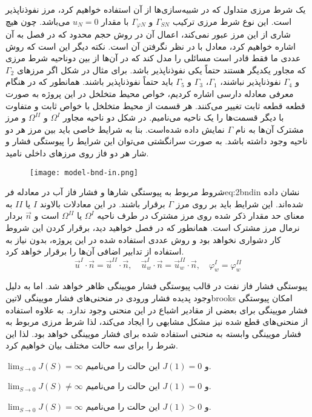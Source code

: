 یک شرط مرزی متداول که در شبیه‌سازی‌ها از آن استفاده خواهیم کرد، مرز نفوذناپذیر است. این نوع شرط مرزی ترکیب $\Gamma_{SN}$ و $\Gamma_{\varphi N}$ با مقدار $u_N = 0$ می‌باشد. چون هیچ شاری از این مرز عبور نمی‌کند، اعمال آن در روش حجم محدود که در فصل  به آن اشاره خواهیم کرد، معادل با در نظر نگرفتن آن است. نکته دیگر این است که روش عددی ما فقط قادر است مسائلی را مدل کند که در آن‌ها از بین دوناحیه شرط مرزی که مجاور یکدیگر هستند حتماً یکی نفوذناپذیر باشد. برای مثال در شکل  اگر مرز‌های 
$\Gamma_2$ و $\Gamma_4$ 
نفوذناپذیر نباشند،‌ 
$\Gamma_1$، $\Gamma_3$ و  $\Gamma_5$
باید حتماً نفوذناپذیر باشند.
\label{ch:253}
همانطور که در هنگام معرفی معادله دارسی اشاره کردیم، خواص محیط متخلخل در این پروژه به صورت قطعه قطعه ثابت تغییر می‌کنند. هر قسمت از محیط متخلخل با خواص ثابت و متفاوت با دیگر قسمت‌ها را یک ناحیه می‌نامیم. در شکل  دو ناحیه مجاور 
$\Omega^{I}$
و
$\Omega^{II}$
و مرز مشترک آن‌ها به نام 
$\Gamma$
 نمایش داده شده‌است.
 بنا به  شرایط خاصی باید بین مرز هر دو ناحیه وجود داشته باشد. به صورت سرانگشتی می‌توان این شرایط را پیوستگی فشار و شار هر دو فاز روی مرز‌های داخلی نامید.
\begin{figure}
\texttt{[image: model-bnd-in.png]}
\label{fig:2bndin}
\end{figure}
شروط مربوط به پیوستگی شار‌ها و فشار فاز آب در معادله ‌فر{eq:2bndin} نشان‌ داده شده‌اند. این شرایط باید بر روی مرز $\Gamma$ برقرار باشند. در این معادلات بالاوند $I$ یا $II$ به معنای حد مقدار ذکر شده روی مرز مشترک در طرف ناحیه $\Omega^{I}$ یا $\Omega^{II}$ است و $\vec n$ بردار نرمال مرز مشترک است. همانطور که در فصل  خواهید دید، برقرار کردن این شروط کار دشواری نخواهد بود و روش عددی استفاده شده در این پروژه، بدون نیاز به استفاده از تدابیر اضافی آن‌ها را برقرار خواهد کرد. 
\begin{equation}
\label{eq:2bndin}
\vec{u}^I \cdot \vec n = \vec{u}^{II} \cdot \vec n, \quad
\vec{u}_w^I \cdot \vec n = \vec{u}_w^{II} \cdot \vec n, \quad
\varphi_w^I = \varphi_w^{II} 
\end{equation} 

پیوستگی فشار فاز نفت در قالب پیوستگی فشار مویینگی ظاهر خواهد شد. اما به دلیل وجود پدیده فشار ورودی در منحنی‌های فشار مویینگی ‌لاتین{brooks} امکان پیوستگی فشار مویینگی برای بعضی از مقادیر اشباع در این منحنی وجود ندارد. به علاوه استفاده از منحنی‌های قطع شده نیز مشکل مشابهی را ایجاد می‌کند، لذا شرط مرزی مربوط به فشار مویینگی وابسته به منحنی استفاده شده برای فشار مویینگی خواهد بود. لذا این شرط را برای سه حالت مختلف بیان خواهیم کرد.
\begin{tight_enumerate}
\item $\lim_{S\to0}J(S)=\infty$ و $J(1)=0 $ این حالت را  می‌نامیم.
\item $\lim_{S\to0}J(S)\neq\infty$ و $J(1)=0 $ این حالت را  می‌نامیم.
\item $\lim_{S\to0}J(S)=\infty$ و $J(1) > 0$ این حالت را  می‌نامیم.
\end{tight_enumerate}

